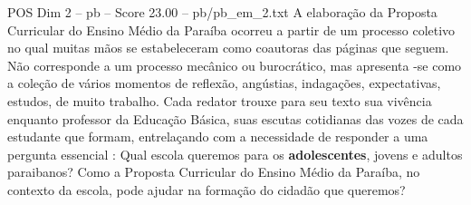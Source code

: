 \begin{textsample}{POS Dim 2 – pb – Score 23.00 – pb/pb\_em\_2.txt}
A elaboração da Proposta Curricular do Ensino Médio da Paraíba ocorreu a partir de um processo coletivo no qual muitas mãos se estabeleceram como coautoras das páginas que seguem.
Não corresponde a um processo mecânico ou burocrático, mas apresenta -se como a coleção de vários momentos de reflexão, angústias, indagações, expectativas, estudos, de muito trabalho.
Cada redator trouxe para seu texto sua vivência enquanto professor da Educação Básica, suas escutas cotidianas das vozes de cada estudante que formam, entrelaçando com a necessidade de responder a uma pergunta essencial : Qual escola queremos para os \textbf{adolescentes}, jovens e adultos paraibanos?
Como a Proposta Curricular do Ensino Médio da Paraíba, no contexto da escola, pode ajudar na formação do cidadão que queremos?

\end{textsample}
